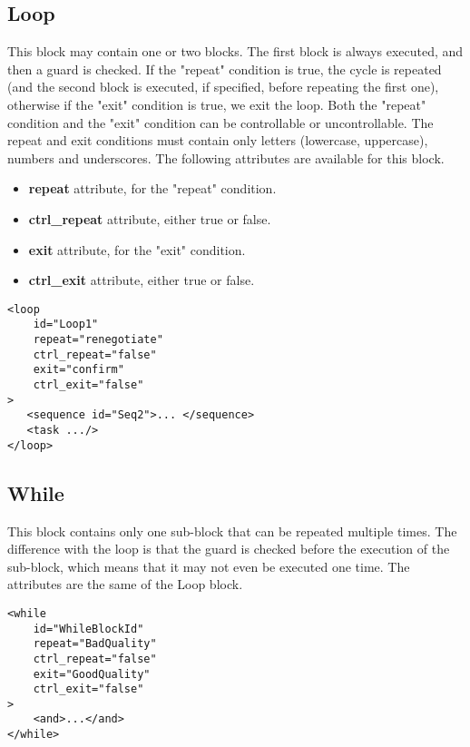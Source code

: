 \documentclass{article}
\begin{document}
\subsection{Loop}
This block may contain one or two blocks. The first block is always executed, and then a guard is checked. If the "repeat" condition is true, the cycle is repeated (and the second block is executed, if specified, before repeating the first one), otherwise if the "exit" condition is true, we exit the loop. Both the "repeat" condition and the "exit" condition can be controllable or uncontrollable. The repeat and exit conditions must contain only letters (lowercase, uppercase), numbers and underscores. The following attributes are available for this block. 
\begin{itemize}
    \item \textbf{repeat} attribute, for the "repeat" condition.
    \item \textbf{ctrl\_repeat} attribute, either true or false.
    \item \textbf{exit} attribute, for the "exit" condition.
    \item \textbf{ctrl\_exit} attribute, either true or false.
\end{itemize}

\begin{lstlisting}
<loop 
    id="Loop1"
    repeat="renegotiate"
    ctrl_repeat="false"
    exit="confirm"
    ctrl_exit="false"
>
   <sequence id="Seq2">... </sequence> 
   <task .../>
</loop>
\end{lstlisting}

\subsection{While}
This block contains only one sub-block that can be repeated multiple times. The difference with the loop is that the guard is checked before the execution of the sub-block, which means that it may not even be executed one time. The attributes are the same of the Loop block.
\begin{lstlisting}
<while
    id="WhileBlockId"
    repeat="BadQuality"
    ctrl_repeat="false"
    exit="GoodQuality"
    ctrl_exit="false"
>
    <and>...</and>
</while>
\end{lstlisting}
\end{document}
